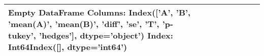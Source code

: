 \begin{tabular}{llrrrrrrr}
\toprule
Empty DataFrame
Columns: Index(['A', 'B', 'mean(A)', 'mean(B)', 'diff', 'se', 'T', 'p-tukey', 'hedges'], dtype='object')
Index: Int64Index([], dtype='int64') \\
\bottomrule
\end{tabular}
